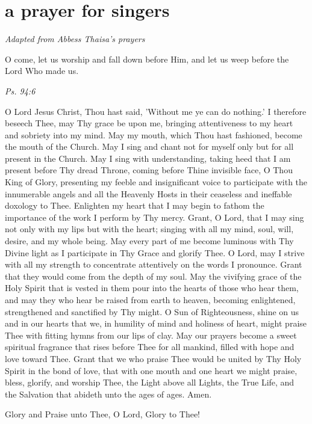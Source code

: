 \section{a prayer for singers}

\begin{center}
   {\textit{\small Adapted from Abbess Thaisa's prayers}}
\end{center}


\epigraph{O come, let us worship and fall down before Him, and let us weep before the Lord Who made us.}{\textit{Ps. 94:6}}

O Lord Jesus Christ, Thou hast said, 'Without me ye can do nothing.' I therefore beseech Thee, may Thy grace be upon me, bringing attentiveness to my heart and sobriety into my mind. May my mouth, which Thou hast fashioned, become the mouth of the Church. May I sing and chant not for myself only but for all present in the Church. May I sing with understanding, taking heed that I am present before Thy dread Throne, coming before Thine invisible face, O Thou King of Glory, presenting my feeble and insignificant voice to participate with the innumerable angels and all the Heavenly Hosts in their ceaseless and ineffable doxology to Thee. Enlighten my heart that I may begin to fathom the importance of the work I perform by Thy mercy. Grant, O Lord, that I may sing not only with my lips but with the heart; singing with all my mind, soul, will, desire, and my whole being. May every part of me become luminous with Thy Divine light as I participate in Thy Grace and glorify Thee. O Lord, may I strive with all my strength to concentrate attentively on the words I pronounce. Grant that they would come from the depth of my soul. May the vivifying grace of the Holy Spirit that is vested in them pour into the hearts of those who hear them, and may they who hear be raised from earth to heaven, becoming enlightened, strengthened and sanctified by Thy might. O Sun of Righteousness, shine on us and in our hearts that we, in humility of mind and holiness of heart, might praise Thee with fitting hymns from our lips of clay. May our prayers become a sweet spiritual fragrance that rises before Thee for all mankind, filled with hope and love toward Thee. Grant that we who praise Thee would be united by Thy Holy Spirit in the bond of love, that with one mouth and one heart we might praise, bless, glorify, and worship Thee, the Light above all Lights, the True Life, and the Salvation that abideth unto the ages of ages. Amen.


Glory and Praise unto Thee, O Lord, Glory to Thee!


